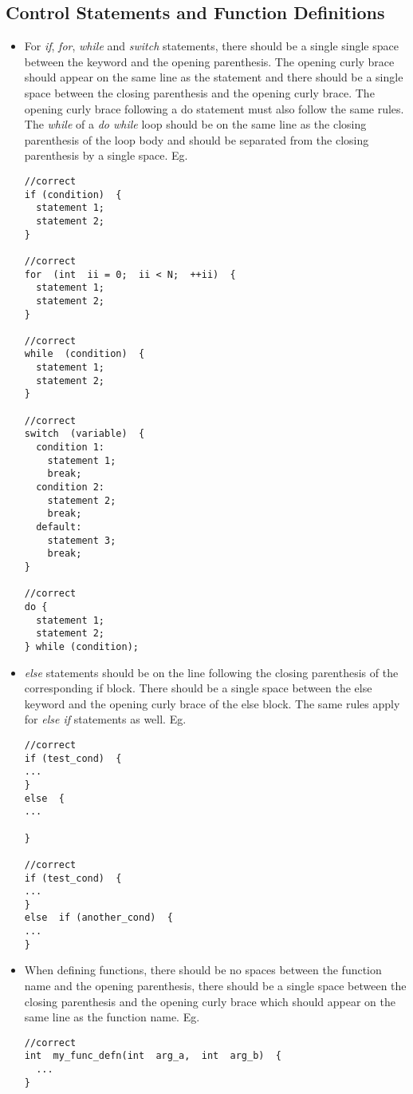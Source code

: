 \subsection{Control Statements and Function Definitions}

\begin{itemize}

  \item For \textit{if}, \textit{for}, \textit{while}
and \textit{switch} statements, there should be a single single space
between the keyword and the opening parenthesis.  The opening curly
brace should appear on the same line as the statement and there should
be a single space between the closing parenthesis and the opening
curly brace.  The opening curly brace following a do statement must
also follow the same rules.  The \textit{while} of a \textit{do while}
loop should be on the same line as the closing parenthesis of the loop
body and should be separated from the closing parenthesis by a single
space.  Eg.

\begin{Verbatim}
//correct
if (condition)  { 
  statement 1; 
  statement 2;
}

//correct
for  (int  ii = 0;  ii < N;  ++ii)  {
  statement 1;
  statement 2;
}

//correct
while  (condition)  { 
  statement 1; 
  statement 2;
}

//correct
switch  (variable)  {
  condition 1: 
    statement 1; 
    break;
  condition 2: 
    statement 2; 
    break;
  default: 
    statement 3; 
    break;
}

//correct 
do {
  statement 1;
  statement 2;
} while (condition);
\end{Verbatim}



  \item \textit{else} statements should be on the line following the
closing parenthesis of the corresponding if block. There should be a
single space between the else keyword and the opening curly brace of
the else block. The same rules apply for \textit{else if} statements
as well.  Eg.

\begin{Verbatim}
//correct
if (test_cond)  {
...
}
else  {
...

}

//correct
if (test_cond)  {
...
}
else  if (another_cond)  {
...
}
\end{Verbatim}

  \item When defining functions, there should be no spaces between the
function name and the opening parenthesis, there should be a single
space between the closing parenthesis and the opening curly brace which
should appear on the same line as the function name.  Eg.

\begin{Verbatim}
//correct
int  my_func_defn(int  arg_a,  int  arg_b)  {
  ...
}
\end{Verbatim}
\end{itemize}


